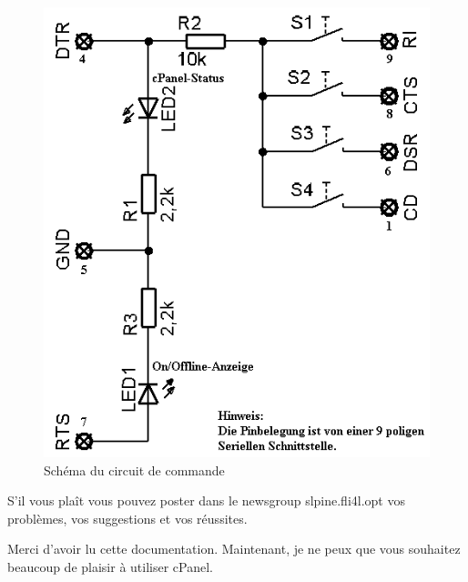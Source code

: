   \begin{figure}[htbp]
    \centering
    \includegraphics[width=485pt]{schematic}
    \caption{Schéma du circuit de commande}
    \label{fig:schaltplan}
  \end{figure}



S'il vous plaît vous pouvez poster dans le newsgroup slpine.fli4l.opt vos
problèmes, vos suggestions et vos réussites.

Merci d'avoir lu cette documentation. Maintenant, je ne peux que vous
souhaitez beaucoup de plaisir à utiliser cPanel.
